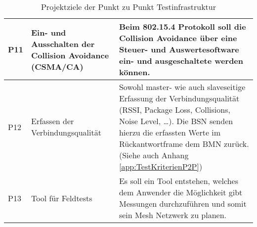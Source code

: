 \begin{table}[H]
\begin{tabular}{ | C{0.7cm} | p{3.7cm} | p{10.2cm} |}
		P11 & Ein- und Ausschalten der Collision Avoidance (CSMA/CA)& Beim 802.15.4 Protokoll soll die Collision Avoidance über eine Steuer- und Auswertesoftware ein- und ausgeschaltete werden können.\\ \hline
		
		P12 & Erfassen der Verbindungsqualität & Sowohl master- wie auch slaveseitige Erfassung der Verbindungsqualität (RSSI, Package Loss, Collisions, Noise Level, …). Die BSN senden hierzu die erfassten Werte im Rückantwortframe dem BMN zurück. (Siehe auch Anhang \ref{app:TestKriterienP2P})\\ \hline
				
		P13 & Tool für Feldtests & Es soll ein Tool entstehen, welches dem Anwender die Möglichkeit gibt Messungen durchzuführen und somit sein Mesh Netzwerk zu planen.\\ \hline

		
	\end{tabular}\\
	\caption{Projektziele der Punkt zu Punkt Testinfrastruktur}
	\label{tab:ProjektzielederPunktzuPunktTestinfrastruktur}
\end{table}


